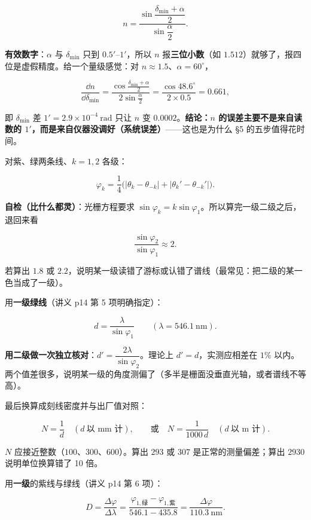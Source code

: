 \documentclass[11pt]{ctexart}
\begin{document}

\[
n=\frac{\sin\dfrac{\delta_{\min}+\alpha}{2}}{\sin\dfrac{\alpha}{2}}.
\]

\textbf{有效数字}：$\alpha$ 与 $\delta_{\min}$ 只到 $0.5'$--$1'$，所以 $n$ 报\textbf{三位小数}（如 $1.512$）就够了，报四位是虚假精度。给一个量级感觉：对 $n\approx1.5$、$\alpha=60^{\circ}$，

\[
\frac{\dd n}{\dd\delta_{\min}}=\frac{\cos\frac{\delta_{\min}+\alpha}{2}}{2\sin\frac{\alpha}{2}}
=\frac{\cos48.6^{\circ}}{2\times0.5}=0.661,
\]

即 $\delta_{\min}$ 差 $1'=2.9\times10^{-4}\ \mathrm{rad}$ 只让 $n$ 变 $0.0002$。\textbf{结论：$n$ 的误差主要不是来自读数的 $1'$，而是来自仪器没调好（系统误差）}——这也是为什么 §5 的五步值得花时间。


对紫、绿两条线、$k=1,2$ 各级：

\[
\varphi_k=\frac14\bigl(|\theta_k-\theta_{-k}|+|\theta_k'-\theta_{-k}'|\bigr).
\]

\textbf{自检（比什么都灵）}：光栅方程要求 $\sin\varphi_k=k\sin\varphi_1$。所以算完一级二级之后，退回来看

\[
\frac{\sin\varphi_2}{\sin\varphi_1}\approx2 .
\]

若算出 $1.8$ 或 $2.2$，说明某一级读错了游标或认错了谱线（最常见：把二级的某一色当成了一级）。


用\textbf{一级绿线}（讲义 p14 第 5 项明确指定）：

\[
d=\frac{\lambda}{\sin\varphi_1}\qquad(\lambda=546.1\ \mathrm{nm}).
\]

\textbf{用二级做一次独立核对}：$d'=\dfrac{2\lambda}{\sin\varphi_2}$。理论上 $d'=d$，实测应相差在 $1\%$ 以内。两个值差很多，说明某一级的角度测偏了（多半是栅面没垂直光轴，或者谱线不等高）。

最后换算成刻线密度并与出厂值对照：

\[
N=\frac{1}{d}\quad(d\ \text{以 mm 计}),\qquad
\text{或}\quad N=\frac{1}{1000\,d}\quad(d\ \text{以 m 计}).
\]

$N$ 应接近整数（$100$、$300$、$600$）。算出 $293$ 或 $307$ 是正常的测量偏差；算出 $2930$ 说明单位换算错了 10 倍。


用\textbf{一级}的紫线与绿线（讲义 p14 第 6 项）：

\[
D=\frac{\Delta\varphi}{\Delta\lambda}
=\frac{\varphi_{1,\text{绿}}-\varphi_{1,\text{紫}}}{546.1-435.8}
=\frac{\Delta\varphi}{110.3\ \mathrm{nm}}.
\]
\end{document}
